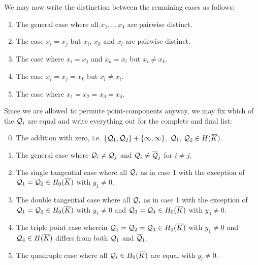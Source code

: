 \documentclass[english,11pt,a4paper]{article}
\begin{document}
We may now write the distinction between the remaining cases as follows:

\begin{enumerate}
	\parskip 1mm
	\item The general case where all $x_1,..,x_4$ are pairwise distinct.
	\item The case $x_i = x_j$ but $x_i$, $x_k$ and $x_l$ are pairwise distinct.
	\item The case where $x_i = x_j$ and $x_k = x_l$ but $x_i \neq x_k$.
	\item The case $x_i = x_j = x_k$ but $x_l \neq x_i$.
	\item The case where $x_1 = x_2 = x_3 = x_4$.
\end{enumerate}
\parskip 3mm

Since we are allowed to permute point-components anyway, we may fix which of the $\mathcal{Q}_i$ are equal and write everything out for the complete and final list:

\vspace{-3mm}
\fline
\begin{enumerate}\setcounter{enumi}{-1}
	\parskip 1mm
	\item The addition with zero, i.e. $\{ \mathcal{Q}_1, \mathcal{Q}_2 \} + \{ \infty, \infty \}$, $\mathcal{Q}_1$, $\mathcal{Q}_2 \in H(\overline K)$.
	\item The general case where $\mathcal{Q}_i \neq \mathcal{Q}_j$ and $\mathcal{Q}_i \neq \overline {\mathcal{Q}}_j$ for $i \neq j$.
	\item The single tangential case where all $\mathcal{Q}_i$ as in case 1 with the exception of $\mathcal{Q}_1 = \mathcal{Q}_2 \in H_0(\overline K)$ with $y_1 \neq 0$.%
	\item The double tangential case where all $\mathcal{Q}_i$ as in case 1 with the exception of $\mathcal{Q}_1 = \mathcal{Q}_2 \in H_0(\overline K)$ with $y_1 \neq 0$ and $\mathcal{Q}_3 = \mathcal{Q}_4 \in H_0(\overline K)$ with $y_3 \neq 0$.%
	\item The triple point case wherein $\mathcal{Q}_1=\mathcal{Q}_2=\mathcal{Q}_3 \in H_0(\overline K)$ with $y_1 \neq 0$ and $\mathcal{Q}_4 \in H(\overline K)$ differs from both $\mathcal{Q}_1$ and $\overline {\mathcal{Q}}_1$.
	\item The quadruple case where all $\mathcal{Q}_i \in H_0(\overline K)$ are equal with $y_i\neq 0$.
\end{enumerate}
\vspace{-2mm}
\fline
\parskip 3mm
\end{document}
